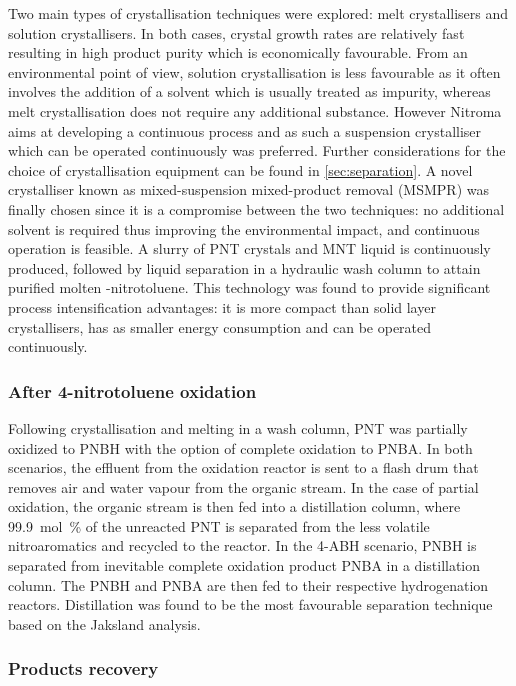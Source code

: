 Two main types of crystallisation techniques were explored: melt crystallisers and solution crystallisers. In both cases, crystal growth rates are relatively fast resulting in high product purity which is economically favourable. From an environmental point of view, solution crystallisation is less favourable as it often involves the addition of a solvent which is usually treated as impurity, whereas melt crystallisation does not require any additional substance. However Nitroma aims at developing a continuous process and as such a suspension crystalliser which can be operated continuously was preferred. Further considerations for the choice of crystallisation equipment can be found in \cref{sec:separation}. A novel crystalliser known as mixed-suspension mixed-product removal (MSMPR) was finally chosen since it is a compromise between the two techniques: no additional solvent is required thus improving the environmental impact, and continuous operation is feasible. A slurry of PNT crystals and MNT liquid is continuously produced, followed by liquid separation in a hydraulic wash column to attain purified molten \para-nitrotoluene. This technology was found to provide significant process intensification advantages: it is more compact than solid layer crystallisers, has as smaller energy consumption and can be operated continuously.

\subsubsection{After 4-nitrotoluene oxidation}

Following crystallisation and melting in a wash column, PNT was partially oxidized to PNBH with the option of complete oxidation to PNBA. In both scenarios, the effluent from the oxidation reactor is sent to a flash drum that removes air and water vapour from the organic stream. In the case of partial oxidation, the organic stream is then fed into a distillation column, where \SI{99.9}{mol\percent} of the unreacted PNT is separated from the less volatile nitroaromatics and recycled to the reactor. 
In the 4-ABH scenario, PNBH is separated from inevitable complete oxidation product PNBA in a distillation column. The PNBH and PNBA are then fed to their respective hydrogenation reactors. Distillation was found to be the most favourable separation technique based on the Jaksland analysis.


\subsubsection{Products recovery}

